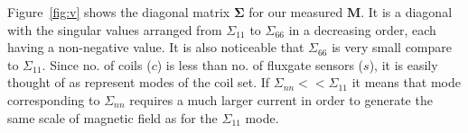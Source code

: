 


 
Figure~\ref{fig:v} shows the diagonal matrix $\bm{\Sigma}$ for our measured $\bm{M}$. It is a diagonal with the singular values arranged from $\Sigma_{11}$ to $\Sigma_{66}$ in a decreasing order, each having a non-negative value. It is also noticeable that $\Sigma_{66}$ is very small compare to $\Sigma_{11}$. Since no. of coils ($c$) is less than no. of fluxgate sensors ($s$), it is easily thought of as represent modes of the coil set. If $\Sigma_{nn}<<\Sigma_{11}$ it means that mode corresponding to  $\Sigma_{nn}$ requires a much larger current in order to generate the same scale of magnetic field as for the $\Sigma_{11}$ mode. 


